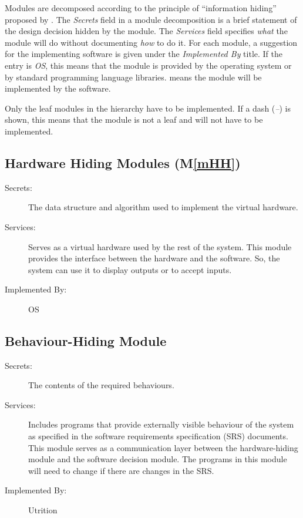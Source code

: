 \documentclass[12pt, titlepage]{article}
\newcommand{\mref}[1]{M\ref{#1}}
\begin{document}
Modules are decomposed according to the principle of ``information hiding''
proposed by \citet{ParnasEtAl1984}. The \emph{Secrets} field in a module
decomposition is a brief statement of the design decision hidden by the
module. The \emph{Services} field specifies \emph{what} the module will do
without documenting \emph{how} to do it. For each module, a suggestion for the
implementing software is given under the \emph{Implemented By} title. If the
entry is \emph{OS}, this means that the module is provided by the operating
system or by standard programming language libraries.  \emph{\progname{}} means the
module will be implemented by the \progname{} software.

Only the leaf modules in the hierarchy have to be implemented. If a dash
(\emph{--}) is shown, this means that the module is not a leaf and will not have
to be implemented.

\subsection{Hardware Hiding Modules (\mref{mHH})}

\begin{description}
\item[Secrets:]The data structure and algorithm used to implement the virtual
  hardware.
\item[Services:]Serves as a virtual hardware used by the rest of the
  system. This module provides the interface between the hardware and the
  software. So, the system can use it to display outputs or to accept inputs.
\item[Implemented By:] OS
\end{description}

\subsection{Behaviour-Hiding Module}

\begin{description}
\item[Secrets:]The contents of the required behaviours.
\item[Services:]Includes programs that provide externally visible behaviour of
  the system as specified in the software requirements specification (SRS)
  documents. This module serves as a communication layer between the
  hardware-hiding module and the software decision module. The programs in this
  module will need to change if there are changes in the SRS.
\item[Implemented By:] Utrition
\end{description}
\end{document}
